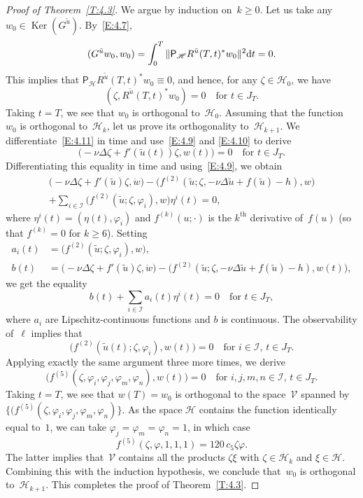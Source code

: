 \documentclass[JEP,XML,SOM,Unicode,ThmDefs]{cedram}
\let\mathcal\mathscr
\theoremstyle{plain}
\numberwithin{equation}{section}
\newcommand{\dd}{{\textup d}}
\DeclareMathOperator{\Ker}{Ker}
\newcommand{\HH}{{\mathcal H}}
\newcommand{\II}{{\mathcal I}}
\newcommand{\VV}{{\mathcal V}}
\begin{document}
\begin{proof}[Proof of Theorem~\ref{T:4.3}]
We argue by induction on~$k \ge 0$. Let us take any $w_0\in \Ker(G^{\tilde u})$. By~\eqref{E:4.7},
\[
(G^{\tilde u}w_0,w_0)=\int_0^T\|{\mathsf P}_\HH R^{\tilde u}(T,t)^*w_0\|^2\dd t=0.
\]
This implies that ${\mathsf P}_\HH R^{\tilde u}(T,t)^*w_0\equiv0$, and hence, for any $\zeta\in\HH_0$, we have
\begin{equation} \label{E:4.11}
(\zeta,R^{\tilde u}(T,t)^*w_0)=0\quad \text{for $t\in J_T$}.
\end{equation}
Taking $t=T$, we see that $w_0$ is orthogonal to~$\HH_0$. Assuming that the function~$w_0$ is orthogonal to~$\HH_k$, let us prove its orthogonality to~$\HH_{k+1}$. We differentiate~\eqref{E:4.11} in time and use~\eqref{E:4.9} and \eqref{E:4.10} to derive
\[
\bigl(-\nu\Delta \zeta+f'(\tilde u(t))\zeta,w(t)\bigr)=0\quad\text{for $t\in J_T$}.
\]
Differentiating this equality in time and using~\eqref{E:4.9}, we obtain\vspace*{-3pt}
\begin{multline*}
\bigl(-\nu\Delta\zeta+f'(\tilde u)\zeta,\dot w\bigr)-\bigl(f^{(2)}(\tilde u;\zeta,-\nu\Delta\tilde u+f(\tilde u)-h),w\bigr)\\
+\sum_{i\in\II}\bigl(f^{(2)}(\tilde u;\zeta,\varphi_i),w\bigr)\eta^i(t)=0,
\end{multline*}
where $\eta^i(t)=(\eta(t),\varphi_i)$ and $f^{(k)}(u;\cdot)$ is the $k^\text{th}$ derivative of~$f(u)$ (so that $f^{(k)}=0$ for $k\ge6$). Setting\vspace*{-3pt}
\begin{align*}
a_i(t)&=\bigl(f^{(2)}(\tilde u;\zeta,\varphi_i),w\bigr),\\
b(t)&= \bigl(-\nu\Delta\zeta+f'(\tilde u)\zeta,\dot w\bigr)-\bigl(f^{(2)}(\tilde u;\zeta,-\nu\Delta\tilde u+f(\tilde u)-h),w(t)\bigr),
\end{align*} we get the equality\vspace*{-3pt}
\[
b(t)+\sum_{i\in\II}a_i(t)\eta^i(t)=0\quad\text{for $t\in J_T$},
\] where $a_i$
are Lipschitz-continuous functions and $b$ is continuous. The observability of~$\ell$ implies that\vspace*{-3pt}
\begin{equation*}
\bigl(f^{(2)}(\tilde u(t);\zeta,\varphi_i),w(t)\bigr)=0
\quad\text{for $i\in\II$, $t\in J_T$}.
\end{equation*}
Applying exactly the same argument three more times, we derive\vspace*{-3pt}
\[
\bigl(f^{(5)}(\zeta,\varphi_i,\varphi_j,\varphi_m,\varphi_n),w(t)\bigr)=0
\quad\text{for $i,j,m,n\in\II$, $t\in J_T$}.
\]
Taking $t=T$, we see that $w(T)=w_0$ is orthogonal to the space~$\VV$ spanned by~$\{(f^{(5)}(\zeta,\varphi_i,\varphi_j,\varphi_m,\varphi_n)\}$. As the space $\HH$ contains the function identically equal to~$1$, we can take $\varphi_j=\varphi_m=\varphi_n=1$, in which case\vspace*{-3pt}
\[
f^{(5)}(\zeta,\varphi,1,1,1)=120\,c_5 \zeta\varphi.
\]
The latter implies that~$\VV$ contains all the products $\zeta\xi$ with $\zeta\in\HH_k$ and $\xi\in\HH$. Combining this with the induction hypothesis, we conclude that~$w_0$ is orthogonal to~$\HH_{k+1}$. This completes the proof of Theorem~\ref{T:4.3}.
\end{proof}
\end{document}

